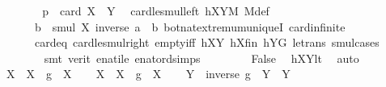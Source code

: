 \begin{isabellebody}
\ \ \ \ \isamarkupfalse%
\ \isamarkupfalse%
\ {\isachardoublequoteopen}p\ {\isasymle}\ card\ {\isacharparenleft}{\kern0pt}X\ {\isasymcdots}\ Y{\isacharparenright}{\kern0pt}{\isachardoublequoteclose}\ \isamarkupfalse%
\ card{\isacharunderscore}{\kern0pt}le{\isacharunderscore}{\kern0pt}smul{\isacharunderscore}{\kern0pt}left\ hXYM\ M{\isacharunderscore}{\kern0pt}def\ \isanewline
\ \ \ \ \ \ {\isacartoucheopen}b\ {\isasymin}\ smul\ X\ {\isacharbraceleft}{\kern0pt}inverse\ a\ {\isasymcdot}\ b{\isacharbraceright}{\kern0pt}{\isacartoucheclose}\ bot{\isacharunderscore}{\kern0pt}nat{\isacharunderscore}{\kern0pt}{}{\isachardot}{\kern0pt}extremum{\isacharunderscore}{\kern0pt}uniqueI\ card{\isachardot}{\kern0pt}infinite\ \isanewline
\ \ \ \ \ \ card{\isacharunderscore}{\kern0pt}{}{\isacharunderscore}{\kern0pt}eq\ card{\isacharunderscore}{\kern0pt}le{\isacharunderscore}{\kern0pt}smul{\isacharunderscore}{\kern0pt}right\ empty{\isacharunderscore}{\kern0pt}iff\ hXY\ hXfin\ hYG\ le{\isacharunderscore}{\kern0pt}trans\ smul{\isachardot}{\kern0pt}cases\isanewline
\ \ \ \ \ \ \isamarkupfalse%
\ {\isacharparenleft}{\kern0pt}smt\ {\isacharparenleft}{\kern0pt}verit{\isacharparenright}{\kern0pt}\ enat{\isacharunderscore}{\kern0pt}ile\ enat{\isacharunderscore}{\kern0pt}ord{\isacharunderscore}{\kern0pt}simps{\isacharparenleft}{\kern0pt}{}{\isacharparenright}{\kern0pt}{\isacharparenright}{\kern0pt}\ \isanewline
\ \ \ \ \isamarkupfalse%
\ \isamarkupfalse%
\ False\ \isamarkupfalse%
\ hXYlt\ \isamarkupfalse%
\ auto\isanewline
\ \ \isamarkupfalse%
\isanewline
\ \ \isamarkupfalse%
\ {\isacharquery}{\kern0pt}X{}\ {\isacharequal}{\kern0pt}\ {\isachardoublequoteopen}{\isacharparenleft}{\kern0pt}X\ {\isasymcdots}\ {\isacharbraceleft}{\kern0pt}g{\isacharbraceright}{\kern0pt}{\isacharparenright}{\kern0pt}\ {\isasyminter}\ X{\isachardoublequoteclose}\isanewline
\ \ \isamarkupfalse%
\ {\isacharquery}{\kern0pt}X{}\ {\isacharequal}{\kern0pt}\ {\isachardoublequoteopen}{\isacharparenleft}{\kern0pt}X\ {\isasymcdots}\ {\isacharbraceleft}{\kern0pt}g{\isacharbraceright}{\kern0pt}{\isacharparenright}{\kern0pt}\ {\isasymunion}\ X{\isachardoublequoteclose}\isanewline
\ \ \isamarkupfalse%
\ {\isacharquery}{\kern0pt}Y{}\ {\isacharequal}{\kern0pt}\ {\isachardoublequoteopen}{\isacharparenleft}{\kern0pt}{\isacharbraceleft}{\kern0pt}inverse\ g{\isacharbraceright}{\kern0pt}\ {\isasymcdots}\ Y{\isacharparenright}{\kern0pt}\ {\isasymunion}\ Y{\isachardoublequoteclose}\isanewline

\end{isabellebody}
